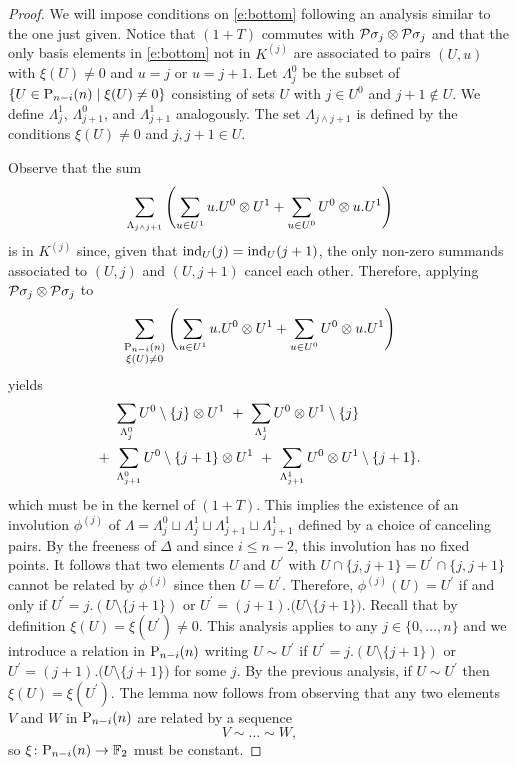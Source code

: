 \begin{proof}
	We will impose conditions on \eqref{e:bottom} following an analysis similar to the one just given.
	Notice that $(1+T)$ commutes with $\cP\sigma_j \otimes \cP\sigma_j$ and that the only basis elements in \eqref{e:bottom} not in $K^{(j)}$ are associated to pairs $(U, u)$ with $\xi(U) \neq 0$ and $u = j$ or $ u = j+1$.
	Let $\Lambda_{j}^0$ be the subset of $\{U \in \P_{n-i}(n) \mid \xi(U) \neq 0\}$ consisting of sets $U$ with $j \in U^0$ and $j+1 \notin U$.
	We define $\Lambda_{j}^1$, $\Lambda_{j+1}^0$, and $\Lambda_{j+1}^1$ analogously.
	The set $\Lambda_{j \wedge j+1}$ is defined by the conditions $\xi(U) \neq 0$ and $j,j+1 \in U$.

	Observe that the sum
	\[
	\sum_{\Lambda_{j \wedge j+1}} \left( \sum_{u \in U^1} {u.U^0} \ot {U^1} +
	\sum_{u \in U^0} {U^0} \ot {u.U^1} \right)
	\]
	is in $K^{(j)}$ since, given that $\ind_U(j) = \ind_U(j+1)$, the only non-zero summands associated to $(U,j)$ and $(U,j+1)$ cancel each other.
	Therefore, applying $\cP\sigma_j \otimes \cP\sigma_j$ to
	\[
	\sum_{\substack{\P_{n-i}(n) \\ \xi(U) \neq 0}} \left(\sum_{u \in U^1} {u.U^0} \ot {U^1} +
	\sum_{u \in U^0} {U^0} \ot {u.U^1} \right)
	\]
	yields
	\begin{align*}
	&\sum_{\Lambda_{j}^0} U^0 \setminus \{j\} \ot {U^1} \ + \
	\sum_{\Lambda_{j}^1} U^0  \ot {U^1} \setminus \{j\} \\ + \
	&\sum_{\Lambda_{j+1}^0} U^0 \setminus \{j+1\} \ot {U^1} \ + \
	\sum_{\Lambda_{j+1}^1} U^0 \ot {U^1} \setminus \{j+1\}.
	\end{align*}
	which must be in the kernel of $(1+T)$.
	This implies the existence of an involution $\phi^{(j)}$ of $\Lambda = \Lambda^0_{j} \sqcup \Lambda^1_{j} \sqcup \Lambda^1_{j+1} \sqcup \Lambda^1_{j+1}$ defined by a choice of canceling pairs.
	By the freeness of $\Delta$ and since $i \leq n-2$, this involution has no fixed points.
	It follows that two elements $U$ and $U^\prime$ with $U \cap \{j, j+1\} = U^\prime \cap \{j, j+1\}$ cannot be related by $\phi^{(j)}$ since then $U = U^\prime$.
	Therefore, $\phi^{(j)}(U) = U^\prime$ if and only if $U^\prime = j.(U \setminus \{j+1\})$ or $U^\prime = (j+1).\big( U \setminus \{j+1\} \big)$.
	Recall that by definition $\xi(U) = \xi(U^\prime) \neq 0$.
	This analysis applies to any $j \in \{0, \dots, n\}$ and we introduce a relation in $\P_{n-i}(n)$ writing $U \sim U^\prime$ if $U^\prime = j.(U \setminus \{j+1\})$ or $U^\prime = (j+1).\big( U \setminus \{j+1\} \big)$ for some $j$.
	By the previous analysis, if $U \sim U^\prime$ then $\xi(U) = \xi(U^\prime)$.
	The lemma now follows from observing that any two elements $V$ and $W$ in $\P_{n-i}(n)$ are related by a sequence
	\[
	V \sim \dots \sim W,
	\]
	so $\xi \colon \P_{n-i}(n) \to \F$ must be constant.
\end{proof}

